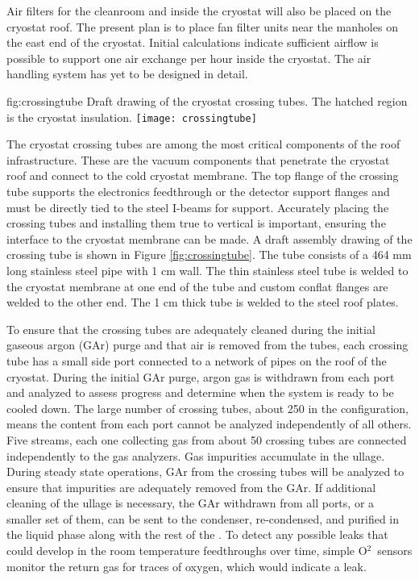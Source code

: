 Air filters for the cleanroom and inside the cryostat will also be placed on the cryostat roof. The present plan is to place fan filter units near the manholes on the east end of the cryostat. Initial calculations indicate sufficient airflow is possible to support one air exchange per hour inside the cryostat. The air handling system has yet to be designed in detail.


\begin{dunefigure}{fig:crossingtube}
  {Draft drawing of the cryostat crossing tubes. The hatched region is the cryostat insulation.}
\texttt{[image: crossingtube]}
\end{dunefigure}

The cryostat crossing tubes are among the most critical components of the roof infrastructure. These are the vacuum components that penetrate the cryostat roof and connect to the cold cryostat membrane. The top flange of the crossing tube supports the electronics feedthrough or the detector support flanges and must be directly tied to the steel I-beams for support. Accurately placing the crossing tubes and installing them true to vertical is important, ensuring the interface to the cryostat membrane can be made. A draft assembly drawing of the crossing tube is shown in Figure \ref{fig:crossingtube}. The tube consists of a 464 \si{mm} long stainless steel pipe with 1 \si{cm} wall. The thin stainless steel tube is welded to the cryostat membrane at one end of the tube and custom conflat flanges are welded to the other end. The 1 \si{cm} thick tube is welded to the steel roof plates.


To ensure that the crossing tubes are adequately cleaned during the initial gaseous argon (GAr) purge and that air is removed from the tubes, each crossing tube has a small side port connected to a network of pipes on the roof of the cryostat. During the initial GAr purge, argon gas is withdrawn from each port and analyzed to assess progress and determine when the system is ready to be cooled down. The large number of crossing tubes, about 250 in the  configuration, means the content from each port cannot be analyzed independently of all others. Five streams, each one collecting gas from about 50 crossing tubes are connected independently to the gas analyzers. Gas impurities accumulate in the ullage. During steady state operations, GAr from the crossing tubes will be analyzed to ensure that impurities are adequately removed from the GAr.    If additional cleaning of the ullage is necessary, the GAr withdrawn from all ports, or a smaller set of them, can be sent to the condenser, re-condensed, and purified in the liquid phase along with the rest of the . To detect any possible leaks that could develop in the room temperature feedthroughs over time, simple O$^2$\ sensors monitor the return gas for traces of oxygen, which would indicate a leak.

